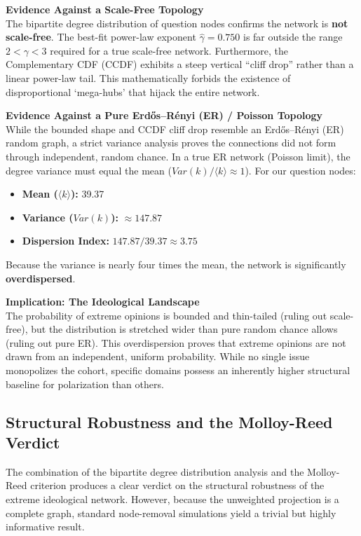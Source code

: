 \documentclass[11pt, a4paper]{article}
\begin{document}
\textbf{Evidence Against a Scale-Free Topology} \\
The bipartite degree distribution of question nodes confirms the network is \textbf{not scale-free}. The best-fit power-law exponent $\hat{\gamma} = 0.750$ is far outside the range $2 < \gamma < 3$ required for a true scale-free network. Furthermore, the Complementary CDF (CCDF) exhibits a steep vertical ``cliff drop'' rather than a linear power-law tail. This mathematically forbids the existence of disproportional `mega-hubs' that hijack the entire network.

\vspace{0.3cm}
\textbf{Evidence Against a Pure Erdős--Rényi (ER) / Poisson Topology} \\
While the bounded shape and CCDF cliff drop resemble an Erdős--Rényi (ER) random graph, a strict variance analysis proves the connections did not form through independent, random chance. In a true ER network (Poisson limit), the degree variance must equal the mean ($Var(k) / \langle k \rangle \approx 1$). For our question nodes:
\begin{itemize}
    \item \textbf{Mean ($\langle k \rangle$):} 39.37
    \item \textbf{Variance ($Var(k)$):} $\approx 147.87$
    \item \textbf{Dispersion Index:} $147.87 / 39.37 \approx 3.75$
\end{itemize}

Because the variance is nearly four times the mean, the network is significantly \textbf{overdispersed}. 

\vspace{0.3cm}
\textbf{Implication: The Ideological Landscape} \\
The probability of extreme opinions is bounded and thin-tailed (ruling out scale-free), but the distribution is stretched wider than pure random chance allows (ruling out pure ER). This overdispersion proves that extreme opinions are not drawn from an independent, uniform probability. While no single issue monopolizes the cohort, specific domains possess an inherently higher structural baseline for polarization than others.

\subsection{Structural Robustness and the Molloy-Reed Verdict}

The combination of the bipartite degree distribution analysis and the Molloy-Reed criterion produces a clear verdict on the structural robustness of the extreme ideological network. However, because the unweighted projection is a complete graph, standard node-removal simulations yield a trivial but highly informative result.
\end{document}
